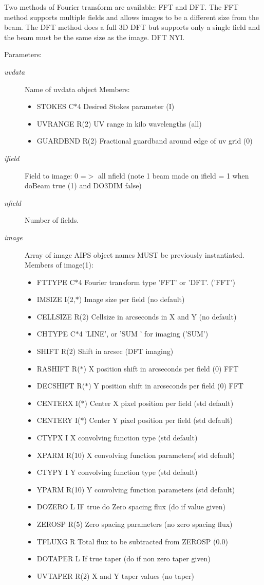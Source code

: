 Two methods of Fourier transform are available: FFT and DFT. The FFT method supports multiple fields and allows images to be a different size from the beam. The DFT method does a full 3D DFT but supports only a single field and the beam must be the same size as the image. DFT NYI. \begin{Desc}
\item[Parameters:]
\begin{description}
\item[{\em uvdata}]Name of uvdata object Members: \begin{itemize}
\item STOKES C$\ast$4 Desired Stokes parameter (I) \item UVRANGE R(2) UV range in kilo wavelengths (all) \item GUARDBND R(2) Fractional guardband around edge of uv grid (0) \end{itemize}
\item[{\em ifield}]Field to image: 0 =$>$ all nfield (note 1 beam made on ifield = 1 when do\-Beam true (1) and DO3DIM false) \item[{\em nfield}]Number of fields. \item[{\em image}]Array of image AIPS object names MUST be previously instantiated. Members of image(1): \begin{itemize}
\item FTTYPE C$\ast$4 Fourier transform type 'FFT' or 'DFT'. ('FFT') \item IMSIZE I(2,$\ast$) Image size per field (no default) \item CELLSIZE R(2) Cellsize in arcseconds in X and Y (no default) \item CHTYPE C$\ast$4 'LINE', or 'SUM ' for imaging ('SUM') \item SHIFT R(2) Shift in arcsec (DFT imaging) \item RASHIFT R($\ast$) X position shift in arcseconds per field (0) FFT \item DECSHIFT R($\ast$) Y position shift in arcseconds per field (0) FFT \item CENTERX I($\ast$) Center X pixel position per field (std default) \item CENTERY I($\ast$) Center Y pixel position per field (std default) \item CTYPX I X convolving function type (std default) \item XPARM R(10) X convolving function parameters( std default) \item CTYPY I Y convolving function type (std default) \item YPARM R(10) Y convolving function parameters (std default) \item DOZERO L IF true do Zero spacing flux (do if value given) \item ZEROSP R(5) Zero spacing parameters (no zero spacing flux) \item TFLUXG R Total flux to be subtracted from ZEROSP (0.0) \item DOTAPER L If true taper (do if non zero taper given) \item UVTAPER R(2) X and Y taper values (no taper) \end{itemize}

\end{description}
\end{Desc}
